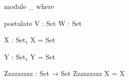 \documentclass{article}
\begin{document}
\begin{AgdaSuppressSpace}{2}
\begin{code}
module _ where
\end{code}
\begin{code}
  postulate V : Set
            W : Set
\end{code}
\end{AgdaSuppressSpace}

\begin{code}
X : Set₁
X =
  Set
\end{code}

\begin{code}
Y : Set₁
Y =       Set

Zzzzzzzzz : Set → Set
Zzzzzzzzz X
          = X
\end{code}
\end{document}
